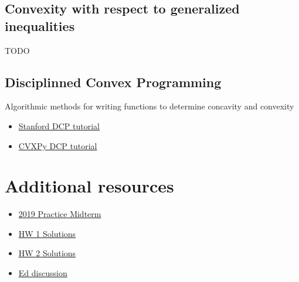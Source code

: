 \documentclass{article}
\begin{document}
\subsection{Convexity with respect to generalized inequalities}
TODO

\subsection{Disciplinned Convex Programming}
Algorithmic methods for writing functions to determine concavity and convexity
\begin{itemize}
  \item \href{https://dcp.stanford.edu/}{Stanford DCP tutorial}
  \item \href{https://www.cvxpy.org/tutorial/dcp/}{CVXPy DCP tutorial}
\end{itemize}

\section{Additional resources}
\begin{itemize}
  \item \href{https://web.stanford.edu/class/ee364a/solutions/midterm_19_sol.pdf}{2019 Practice Midterm}
  \item \href{https://web.stanford.edu/class/ee364a/solutions/hw/2022_hw1sol.pdf}{HW 1 Solutions}
  \item \href{https://web.stanford.edu/class/ee364a/solutions/hw/2022_hw2sol.pdf}{HW 2 Solutions}
  \item \href{https://edstem.org/us/courses/16230/discussion/}{Ed discussion}
\end{itemize}
\end{document}
